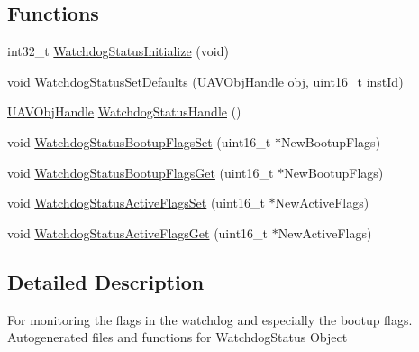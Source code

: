 \subsection*{\-Functions}
\begin{DoxyCompactItemize}
\item 
int32\-\_\-t \hyperlink{group___watchdog_status_ga72a22140d234090c192531f52c21bb99}{\-Watchdog\-Status\-Initialize} (void)
\item 
void \hyperlink{group___watchdog_status_ga13b4fd5afc1012a50b0ab1f817eaaa7f}{\-Watchdog\-Status\-Set\-Defaults} (\hyperlink{targets_2_u_a_v_objects_2inc_2uavobjectmanager_8h_a279053e22be53ce9f895043aaeb91e3b}{\-U\-A\-V\-Obj\-Handle} obj, uint16\-\_\-t inst\-Id)
\item 
\hyperlink{targets_2_u_a_v_objects_2inc_2uavobjectmanager_8h_a279053e22be53ce9f895043aaeb91e3b}{\-U\-A\-V\-Obj\-Handle} \hyperlink{group___watchdog_status_ga9d9225387ccf68f36660cf8bfef29ec1}{\-Watchdog\-Status\-Handle} ()
\item 
void \hyperlink{group___watchdog_status_ga506202b73f67e8ab79cbdec7bfc4a3a5}{\-Watchdog\-Status\-Bootup\-Flags\-Set} (uint16\-\_\-t $\ast$\-New\-Bootup\-Flags)
\item 
void \hyperlink{group___watchdog_status_ga52996d802e43a7938a3f4d58136411cb}{\-Watchdog\-Status\-Bootup\-Flags\-Get} (uint16\-\_\-t $\ast$\-New\-Bootup\-Flags)
\item 
void \hyperlink{group___watchdog_status_ga8e4ccb6bc3c540cc7b7a12a0f8828a6f}{\-Watchdog\-Status\-Active\-Flags\-Set} (uint16\-\_\-t $\ast$\-New\-Active\-Flags)
\item 
void \hyperlink{group___watchdog_status_ga121a92ca0d20e7697da4cd157dda490d}{\-Watchdog\-Status\-Active\-Flags\-Get} (uint16\-\_\-t $\ast$\-New\-Active\-Flags)
\end{DoxyCompactItemize}


\subsection{\-Detailed \-Description}
\-For monitoring the flags in the watchdog and especially the bootup flags. \-Autogenerated files and functions for \-Watchdog\-Status \-Object 

